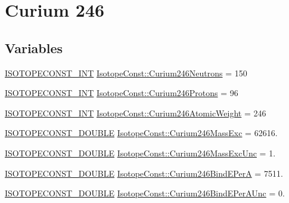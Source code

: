 \hypertarget{group___isotope_const-_curium-_cm246}{}\section{Curium 246}
\label{group___isotope_const-_curium-_cm246}
\subsection*{Variables}
\begin{DoxyCompactItemize}
\item 
\mbox{\hyperlink{group___isotope_const-_macros_ga5f18360b3e99483a35c32d789e62621c}{I\+S\+O\+T\+O\+P\+E\+C\+O\+N\+S\+T\+\_\+\+I\+NT}} \mbox{\hyperlink{group___isotope_const-_curium-_cm246_gaef601c1b5891b0fce43a1e72b2963dd9}{Isotope\+Const\+::\+Curium246\+Neutrons}} = 150
\item 
\mbox{\hyperlink{group___isotope_const-_macros_ga5f18360b3e99483a35c32d789e62621c}{I\+S\+O\+T\+O\+P\+E\+C\+O\+N\+S\+T\+\_\+\+I\+NT}} \mbox{\hyperlink{group___isotope_const-_curium-_cm246_ga102ff8c5eae1bfa4c187a49c1fb77176}{Isotope\+Const\+::\+Curium246\+Protons}} = 96
\item 
\mbox{\hyperlink{group___isotope_const-_macros_ga5f18360b3e99483a35c32d789e62621c}{I\+S\+O\+T\+O\+P\+E\+C\+O\+N\+S\+T\+\_\+\+I\+NT}} \mbox{\hyperlink{group___isotope_const-_curium-_cm246_ga6d64c7ba3e72d944f36c6be541709576}{Isotope\+Const\+::\+Curium246\+Atomic\+Weight}} = 246
\item 
\mbox{\hyperlink{group___isotope_const-_macros_ga8f45a7272ce02c0b4c65c44636ed719a}{I\+S\+O\+T\+O\+P\+E\+C\+O\+N\+S\+T\+\_\+\+D\+O\+U\+B\+LE}} \mbox{\hyperlink{group___isotope_const-_curium-_cm246_ga16b3ff329c539d1a7eb7d989e33200f8}{Isotope\+Const\+::\+Curium246\+Mass\+Exc}} = 62616.
\item 
\mbox{\hyperlink{group___isotope_const-_macros_ga8f45a7272ce02c0b4c65c44636ed719a}{I\+S\+O\+T\+O\+P\+E\+C\+O\+N\+S\+T\+\_\+\+D\+O\+U\+B\+LE}} \mbox{\hyperlink{group___isotope_const-_curium-_cm246_ga044b27d97428029f0b8283c17590cb11}{Isotope\+Const\+::\+Curium246\+Mass\+Exc\+Unc}} = 1.
\item 
\mbox{\hyperlink{group___isotope_const-_macros_ga8f45a7272ce02c0b4c65c44636ed719a}{I\+S\+O\+T\+O\+P\+E\+C\+O\+N\+S\+T\+\_\+\+D\+O\+U\+B\+LE}} \mbox{\hyperlink{group___isotope_const-_curium-_cm246_gae6b26a005fb1229a1c89b0d70175ae7b}{Isotope\+Const\+::\+Curium246\+Bind\+E\+PerA}} = 7511.
\item 
\mbox{\hyperlink{group___isotope_const-_macros_ga8f45a7272ce02c0b4c65c44636ed719a}{I\+S\+O\+T\+O\+P\+E\+C\+O\+N\+S\+T\+\_\+\+D\+O\+U\+B\+LE}} \mbox{\hyperlink{group___isotope_const-_curium-_cm246_gac0d579135deacabedfae27377b32318e}{Isotope\+Const\+::\+Curium246\+Bind\+E\+Per\+A\+Unc}} = 0.

\end{DoxyCompactItemize}
